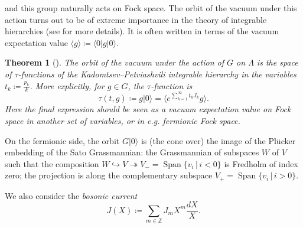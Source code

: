 \documentclass[10pt,a4paper,oneside,no-math,reqno]{amsart}%
\theoremstyle{plain}
\newtheorem{theorem}{Theorem}[section]
\theoremstyle{definition}
\theoremstyle{remark}
\numberwithin{equation}{section}
\newcommand{\mb}[1]{\mathbb{#1}}
\newcommand{\1}{\mathds{1}}
\newcommand{\Z}{\mb{Z}}
\newcommand{\<}{\langle}
\renewcommand{\>}{\rangle}
\begin{document}
and this group naturally acts on Fock space. The orbit of the vacuum under this action turns out to be of extreme importance in the theory of integrable hierarchies (see \cite{MJD00} for more details). It is often written in terms of the vacuum expectation value $ \< g\> \coloneqq \< 0 | g | 0 \>$.

\begin{theorem}[{\cite{SS83}}]
    The orbit of the vacuum under the action of $ G $ on $ \Lambda$ is the space of $\tau $-functions of the Kadomtsev--Petviashvili integrable hierarchy in the variables $ t_k \coloneqq \frac{p_k}{k}$. More explicitly, for $ g \in G$, the $ \tau$-function is
    \begin{equation}
        \tau (t, g) 
        \coloneqq
        g | 0 \>
        =
        \< e^{\sum_{k=1}^\infty t_k J_k} g \>.
    \end{equation}
    Here the final expression should be seen as a vacuum expectation value on Fock space in \emph{another} set of variables, or in e.g. fermionic Fock space.
\end{theorem}

On the fermionic side, the orbit $ G | 0 \> $ is (the cone over) the image of the Plücker embedding of the Sato Grassmannian: the Grassmannian of subspaces $ W$ of $ V $ such that the composition $ W \hookrightarrow V \twoheadrightarrow V_- = \mathop{\mathrm{Span}} \{ v_i \, | \, i < 0\} $ is Fredholm of index zero; the projection is along the complementary subspace $V_+ = \mathop{\mathrm{Span}} \{ v_i \, | \, i > 0\} $.

We also consider the \emph{bosonic current}
\begin{equation}
    J(X)
    \coloneqq
    \sum_{m \in \Z } J_m X^m \frac{dX}{X} .
\end{equation}
\end{document}
